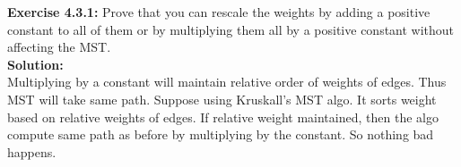 \documentclass[11pt,fleqn]{article}
\begin{document}
\textbf{Exercise 4.3.1:} Prove that you can rescale the weights by adding a positive constant to all of
them or by multiplying them all by a positive constant without affecting the MST.\\

\textbf{Solution:}\\
Multiplying by a constant will maintain relative order of weights of edges. Thus MST will take same path. Suppose using Kruskall's MST algo. It sorts weight based on relative weights of edges. If relative weight maintained, then the algo compute same path as before by multiplying by the constant. So nothing bad happens.

	
\end{document}
